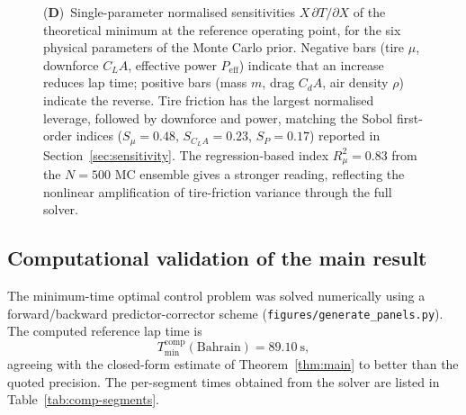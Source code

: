 \documentclass[11pt,twocolumn]{article}
\theoremstyle{definition}
\theoremstyle{remark}
\begin{document}
\begin{figure}[!htbp]
{    (\textbf{D})~Single-parameter normalised sensitivities $X\,\partial T/\partial X$ of the theoretical minimum at the reference operating point, for the six physical parameters of the Monte Carlo prior. Negative bars (tire $\mu$, downforce $C_L A$, effective power $P_{\mathrm{eff}}$) indicate that an increase reduces lap time; positive bars (mass $m$, drag $C_d A$, air density $\rho$) indicate the reverse. Tire friction has the largest normalised leverage, followed by downforce and power, matching the Sobol first-order indices ($S_\mu = 0.48$, $S_{C_LA} = 0.23$, $S_P = 0.17$) reported in Section~\ref{sec:sensitivity}. The regression-based index $R^2_\mu = 0.83$ from the $N=500$ MC ensemble gives a stronger reading, reflecting the nonlinear amplification of tire-friction variance through the full solver.}
    \label{fig:panel3}
\end{figure}

\subsection{Computational validation of the main result}
\label{sec:compvalid}

The minimum-time optimal control problem was solved numerically using a
forward/backward predictor-corrector scheme (\texttt{figures/generate\_panels.py}).
The computed reference lap time is
\[
  T^{\mathrm{comp}}_{\min}(\mathrm{Bahrain}) = 89.10~\mathrm{s},
\]
agreeing with the closed-form estimate of Theorem~\ref{thm:main} to better
than the quoted precision. The per-segment times obtained from the solver
are listed in Table~\ref{tab:comp-segments}.
\end{document}

